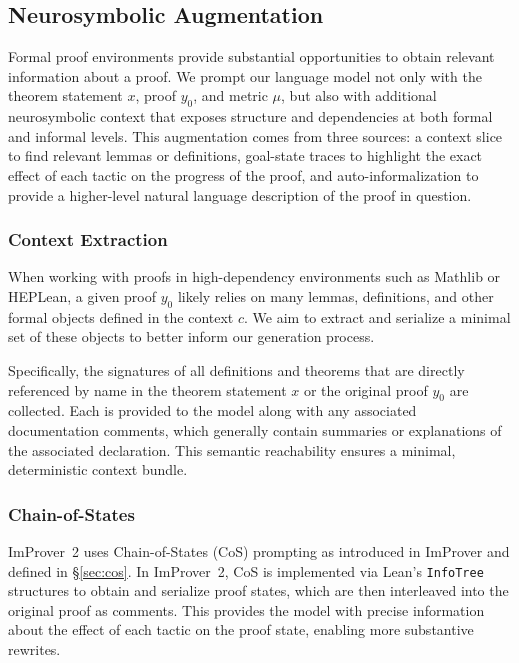 \subsection{Neurosymbolic Augmentation}
\label{sec:ns_aug_ch}

Formal proof environments provide substantial opportunities to obtain relevant information about a proof. We prompt our language model not only with the theorem statement $x$, proof $y_0$, and metric $\mu$, but also with additional neurosymbolic context that exposes structure and dependencies at both formal and informal levels. This augmentation comes from three sources: a context slice to find relevant lemmas or definitions, goal-state traces to highlight the exact effect of each tactic on the progress of the proof, and auto-informalization to provide a higher-level natural language description of the proof in question.

\subsubsection{Context Extraction}
\label{ssec:context_extraction}

When working with proofs in high-dependency environments such as Mathlib or HEPLean, a given proof $y_0$ likely relies on many lemmas, definitions, and other formal objects defined in the context $c$. We aim to extract and serialize a minimal set of these objects to better inform our generation process.

Specifically, the signatures of all definitions and theorems that are directly referenced by name in the theorem statement $x$ or the original proof $y_0$ are collected. Each is provided to the model along with any associated documentation comments, which generally contain summaries or explanations of the associated declaration. This semantic reachability ensures a minimal, deterministic context bundle.

\subsubsection{Chain-of-States}
\label{ssec:cos_in_improver2}

ImProver~2 uses Chain-of-States (CoS) prompting as introduced in ImProver and defined in \S\ref{sec:cos}. In ImProver~2, CoS is implemented via Lean's \texttt{InfoTree} structures to obtain and serialize proof states, which are then interleaved into the original proof as comments. This provides the model with precise information about the effect of each tactic on the proof state, enabling more substantive rewrites.

